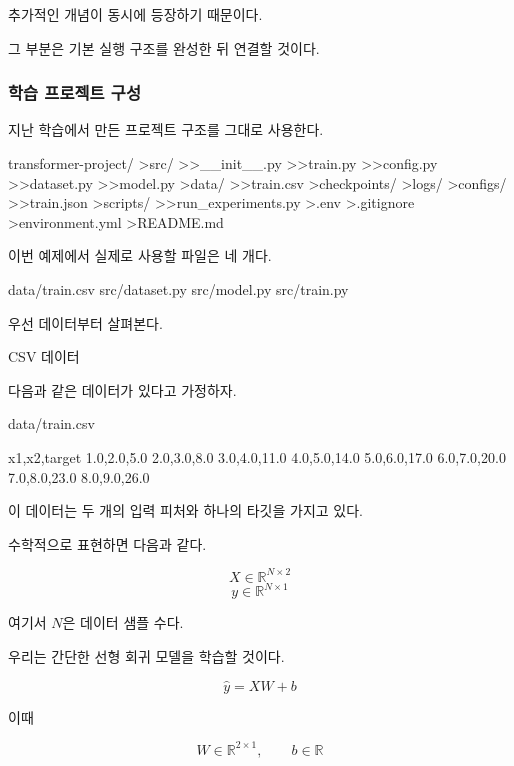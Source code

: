 추가적인 개념이 동시에 등장하기 때문이다.

그 부분은 기본 실행 구조를 완성한 뒤 연결할 것이다.

\subsubsection{학습 프로젝트 구성}

지난 학습에서 만든 프로젝트 구조를 그대로 사용한다.

\begin{dhkdir}[in=6]
transformer-project/
>src/
>>__init__.py
>>train.py
>>config.py
>>dataset.py
>>model.py
>data/
>>train.csv
>checkpoints/
>logs/
>configs/
>>train.json
>scripts/
>>run_experiments.py
>.env
>.gitignore
>environment.yml
>README.md
\end{dhkdir}

이번 예제에서 실제로 사용할 파일은 네 개다.

\begin{dhkzsh}
data/train.csv
src/dataset.py
src/model.py
src/train.py
\end{dhkzsh}

우선 데이터부터 살펴본다.

\begin{dhknote}
\begin{dhksmry}[centered]
CSV 데이터
\end{dhksmry}
\end{dhknote}

다음과 같은 데이터가 있다고 가정하자.

\begin{dhkzsh}
data/train.csv
\end{dhkzsh}

\begin{dhkzsh}
x1,x2,target
1.0,2.0,5.0
2.0,3.0,8.0
3.0,4.0,11.0
4.0,5.0,14.0
5.0,6.0,17.0
6.0,7.0,20.0
7.0,8.0,23.0
8.0,9.0,26.0
\end{dhkzsh}

이 데이터는 두 개의 입력 피처와 하나의 타깃을 가지고 있다.

수학적으로 표현하면 다음과 같다.

\[
X \in \mathbb{R}^{N\times 2}
\]
\[
y \in \mathbb{R}^{N\times 1}
\]

여기서 \(N\)은 데이터 샘플 수다.

우리는 간단한 선형 회귀 모델을 학습할 것이다.

\[
\hat{y}=XW+b
\]

이때

\[
W\in\mathbb{R}^{2\times1},
\qquad
b\in\mathbb{R}
\]

